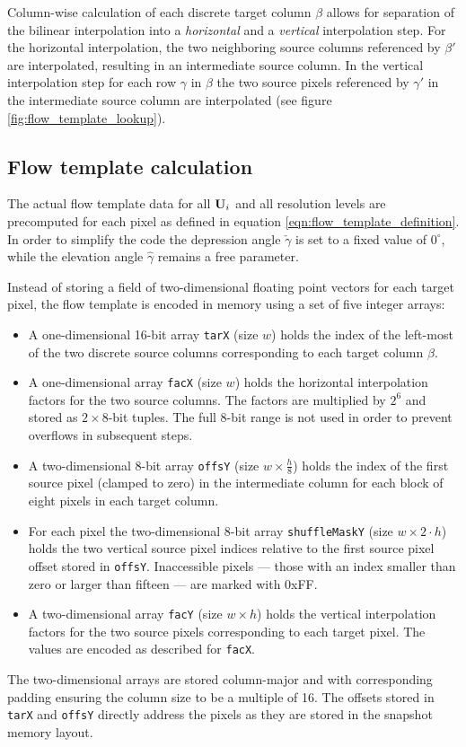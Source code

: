 Column-wise calculation of each discrete target column $\beta$ allows for separation of the bilinear interpolation into a \textit{horizontal} and a \textit{vertical} interpolation step. For the horizontal interpolation, the two neighboring source columns referenced by $\beta'$ are interpolated, resulting in an intermediate source column. In the vertical interpolation step for each row $\gamma$ in $\beta$ the two source pixels referenced by $\gamma'$ in the intermediate source column are interpolated (see figure \ref{fig:flow_template_lookup}).

\subsection{Flow template calculation}

The actual flow template data for all $\mathbf{U}_i$ and all resolution levels are precomputed for each pixel as defined in equation \ref{eqn:flow_template_definition}. In order to simplify the code the depression angle $\check \gamma$ is set to a fixed value of $0^\circ$, while the elevation angle $\hat \gamma$ remains a free parameter.

Instead of storing a field of two-dimensional floating point vectors for each target pixel, the flow template is encoded in memory using a set of five integer arrays:
\begin{itemize}
 \item A one-dimensional 16-bit array \texttt{tarX} (size $w$) holds the index of the left-most of the two discrete source columns corresponding to each target column $\beta$.
 \item A one-dimensional array \texttt{facX} (size $w$) holds the horizontal interpolation factors for the two source columns. The factors are multiplied by $2^6$ and stored as $2 \times 8$-bit tuples. The full 8-bit range is not used in order to prevent overflows in subsequent steps.
 \item A two-dimensional 8-bit array \texttt{offsY} (size $w \times \frac{h}8$) holds the index of the first source pixel (clamped to zero) in the intermediate column for each block of eight pixels in each target column.
 \item For each pixel the two-dimensional 8-bit array \texttt{shuffleMaskY} (size $w \times 2 \cdot h$) holds the two vertical source pixel indices relative to the first source pixel offset stored in \texttt{offsY}. Inaccessible pixels --- those with an index smaller than zero or larger than fifteen --- are marked with 0xFF.
 \item A two-dimensional array \texttt{facY} (size $w \times h$) holds the vertical interpolation factors for the two source pixels corresponding to each target pixel. The values are encoded as described for \texttt{facX}.
\end{itemize}
The two-dimensional arrays are stored column-major and with corresponding padding ensuring the column size to be a multiple of 16. The offsets stored in \texttt{tarX} and \texttt{offsY} directly address the pixels as they are stored in the snapshot memory layout.

